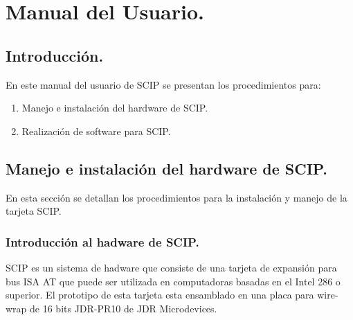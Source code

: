 \chapter[Manual del Usuario.]{Manual del Usuario.}
\label{Apendice:manual}


\fancyhead[LE,RO]{\thepage}


\section{Introducci\'on.}
\label{Section:introduction}

En este manual del usuario de SCIP se presentan los procedimientos para:

\begin{enumerate}
\item Ma\-ne\-jo e ins\-ta\-la\-ci\-\'on del hard\-wa\-re de SCIP.
\item Realizaci\'on de software para SCIP.
\end{enumerate}


\section{Ma\-ne\-jo e ins\-ta\-la\-ci\-\'on del hard\-wa\-re de SCIP.}
\label{Section:manualhdw}

En esta secci\'on se detallan los procedimientos para la instalaci\'on y manejo de la tarjeta %
SCIP.


\subsection{Introducci\'on al hadware de SCIP.}
\label{Subsection:introhwd}

SCIP es un sistema de hadware que consiste de una tarjeta de expansi\'on para bus ISA AT que %
puede ser utilizada en computadoras basadas en el Intel 286 o superior. El prototipo de esta %
tarjeta esta ensamblado en una placa para wire-wrap de 16 bits JDR-PR10 de JDR Microdevices.

